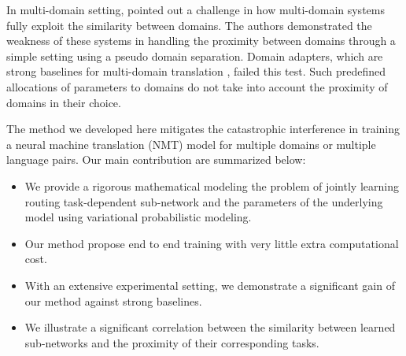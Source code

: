 \documentclass[11pt]{article}
\begin{document}
In multi-domain setting, \citet{Pham21revisiting} pointed out a challenge in how multi-domain systems fully exploit the similarity between domains. The authors demonstrated the weakness of these systems in handling the proximity between domains through a simple setting using a pseudo domain separation. Domain adapters, which are strong baselines for multi-domain translation \cite{Pham20Study}, failed this test. Such predefined allocations of parameters to domains do not take into account the proximity of domains in their choice.

The method we developed here mitigates the catastrophic interference in training a neural machine translation (NMT) model for multiple domains or multiple language pairs. Our main contribution are summarized below:
\begin{itemize}
\setlength{\itemsep}{1pt}
  \setlength{\parskip}{0pt}
  \setlength{\parsep}{0pt}
	\item We provide a rigorous mathematical modeling the problem of jointly learning routing task-dependent sub-network and the parameters of the underlying model using variational probabilistic modeling.
	\item Our method propose end to end training with very little extra computational cost.
	\item With an extensive experimental setting, we demonstrate a significant gain of our method against strong baselines.
	\item We illustrate a significant correlation between the similarity between learned sub-networks and the proximity of their corresponding tasks.
\end{itemize}
\end{document}
